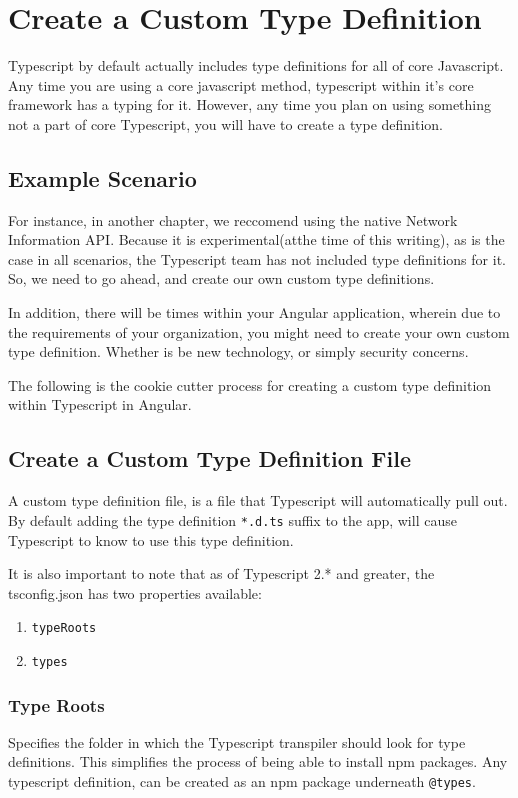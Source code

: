 \chapter{ Create a Custom Type Definition }
Typescript by default actually includes type definitions for all of core
Javascript. Any time you are using a core javascript method, typescript
within it's core framework has a typing for it. However, any time you
plan on using something not a part of core Typescript, you will have to
create a type definition. 

\section{Example Scenario}
For instance, in another chapter, we reccomend using the native Network 
Information API. Because it is experimental(atthe time of this writing),
as is the case in all scenarios, the Typescript team has not included 
type definitions for it. So, we need to go ahead, and create our own 
custom type definitions. 

In addition, there will be times within your Angular application, wherein 
due to the requirements of your organization, you might need to create your 
own custom type definition. Whether is be new technology, or simply security
concerns. 

The following is the cookie cutter process for creating a custom type 
definition within Typescript in Angular. 

\section{Create a Custom Type Definition File}
A custom type definition file, is a file that Typescript will automatically 
pull out. By default adding the type definition \lstinline{*.d.ts} suffix to
the app, will cause Typescript to know to use this type definition.

It is also important to note that as of Typescript 2.* and greater, the
tsconfig.json has two properties available: 
\begin{enumerate}
  \item \lstinline{typeRoots}
  \item \lstinline{types}
\end{enumerate}

\subsection{Type Roots}
Specifies the folder in which the Typescript transpiler should look for type 
definitions. This simplifies the process of being able to install npm packages.
Any typescript definition, can be created as an npm package underneath \lstinline{@types}.

